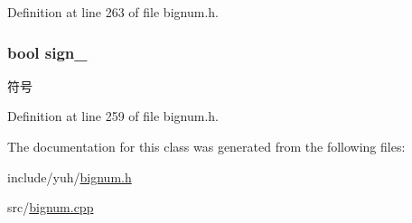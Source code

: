 \-Definition at line 263 of file bignum.\-h.

\hypertarget{classyuh_1_1bignum_abf0bf01a903f906b194bf9f01ff2aab8}{
\subsubsection[{sign\-\_\-}]{\setlength{\rightskip}{0pt plus 5cm}bool {\bf sign\-\_\-}}}\label{d7/d6b/classyuh_1_1bignum_abf0bf01a903f906b194bf9f01ff2aab8}
符号 

\-Definition at line 259 of file bignum.\-h.



\-The documentation for this class was generated from the following files\-:\begin{DoxyCompactItemize}
\item 
include/yuh/\hyperlink{bignum_8h}{bignum.\-h}\item 
src/\hyperlink{bignum_8cpp}{bignum.\-cpp}\end{DoxyCompactItemize}

